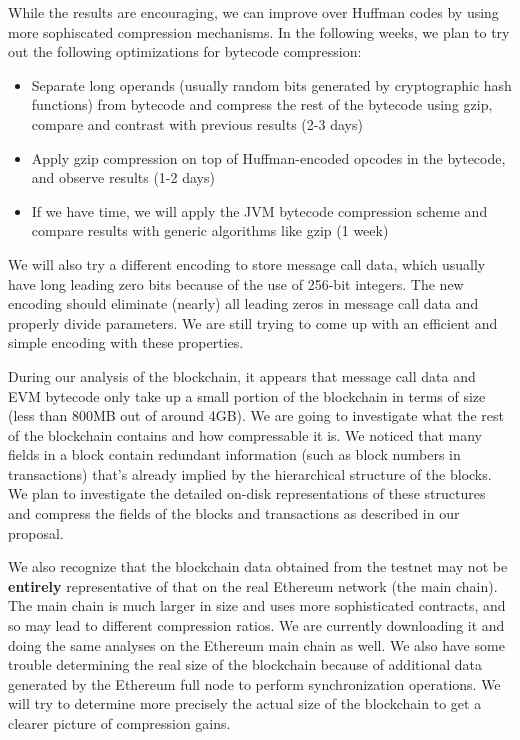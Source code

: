 \documentclass[12pt]{article}
\begin{document}
While the results are encouraging, we can improve over Huffman codes by using more sophiscated compression mechanisms.
In the following weeks, we plan to try out the following optimizations for bytecode compression:

\begin{itemize}
\item Separate long operands (usually random bits generated by cryptographic hash functions) from bytecode and
        compress the rest of the bytecode using gzip, compare and contrast with previous results (2-3 days)
\item Apply gzip compression on top of Huffman-encoded opcodes in the bytecode, and observe results (1-2 days)
\item If we have time, we will apply the JVM bytecode compression scheme and compare results with generic algorithms like gzip (1 week)
\end{itemize}

We will also try a different encoding to store message call data, which usually have long leading zero bits because of the use
of 256-bit integers. The new encoding should eliminate (nearly) all leading zeros in message call data and properly divide parameters.
We are still trying to come up with an efficient and simple encoding with these properties.

During our analysis of the blockchain, it appears that message call data and EVM bytecode only take up a small portion of the blockchain
in terms of size (less than 800MB out of around 4GB). We are going to investigate what the rest of the blockchain contains and how compressable
it is. We noticed that many fields in a block contain redundant information (such as block numbers in transactions) that's already implied
by the hierarchical structure of the blocks. We plan to investigate the detailed on-disk representations of these structures and compress
the fields of the blocks and transactions as described in our proposal.

We also recognize that the blockchain data obtained from the testnet may not be \textbf{entirely} representative of that on the real Ethereum network
(the main chain). The main chain is much larger in size and uses more sophisticated contracts, and so may lead to different compression ratios.
We are currently downloading it and doing the same analyses on the Ethereum main chain as well. We also have some trouble determining the real
size of the blockchain because of additional data generated by the Ethereum full node to perform synchronization operations. We will try to
determine more precisely the actual size of the blockchain to get a clearer picture of compression gains.
\end{document}
